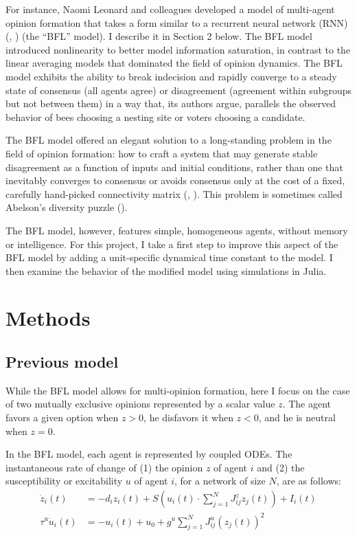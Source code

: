 \documentclass[]{article}
\begin{document}
For instance, Naomi Leonard and colleagues developed a model of multi-agent opinion formation that takes a form similar to a recurrent neural network (RNN) (\cite{bizyaevaNonlinearOpinionDynamics2022}, \cite{leonardFastFlexibleMultiAgent2024}) (the “BFL” model). I describe it in Section 2 below. The BFL model introduced nonlinearity to better model information saturation, in contrast to the linear averaging models that dominated the field of opinion dynamics. The BFL model exhibits the ability to break indecision and rapidly converge to a steady state of consensus (all agents agree) or disagreement (agreement within subgroups but not between them) in a way that, its authors argue, parallels the observed behavior of bees choosing a nesting site or voters choosing a candidate.

The BFL model offered an elegant solution to a long-standing problem in the field of opinion formation: how to craft a system that may generate stable disagreement as a function of inputs and initial conditions, rather than one that inevitably converges to consensus or avoids consensus only at the cost of a fixed, carefully hand-picked connectivity matrix (\cite{ravazziDynamicalSocialNetworks2021}, \cite{bernardoBoundedConfidenceOpinion2024}). This problem is sometimes called Abelson's diversity puzzle (\cite{abelsonMathematicalModelsDistribution1964}).

The BFL model, however, features simple, homogeneous agents, without memory or intelligence.  For this project, I take a first step to improve this aspect of the BFL model by adding a unit-specific dynamical time constant to the model. I then examine the behavior of the modified model using simulations in Julia.

\section{Methods}
\subsection{Previous model}

While the BFL model allows for multi-opinion formation, here I focus on the case of two mutually exclusive opinions represented by a scalar value $z$. The agent favors a given option when $z>0$, he disfavors it when $z<0$, and he is neutral when $z = 0$.

In the BFL model, each agent is represented by coupled ODEs. The instantaneous rate of change of (1) the opinion $z$ of agent $i$ and (2) the susceptibility or excitability $u$ of agent $i$, for a network of size $N$, are as follows:
\begin{align}
	\dot{z}_{i}(t) &= -d_{i}z_{i}(t) + S \left( u_i(t) \cdot  \sum^{N}_{j=1} J^z_{ij}z_{j}(t)  \right) + I_{i}(t) \\
	\tau^u \dot{u}_i(t) &= -u_i(t)+u_0+g^u \sum ^{N}_{j=1} J^u_{ij}(z_{j}(t))^2
\end{align}
\end{document}
